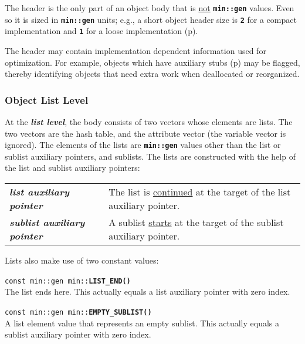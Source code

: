\documentclass[12pt]{article}
\makeatletter
\newcommand{\TT}[1]{{\tt \bfseries #1}}
\newcommand{\key}[1]{{\bf \em #1}\index{#1}}
\newcommand{\ttindex}[1]{\index{#1@{\tt #1}}}
\newcommand{\pagref}[1]{p\pageref{#1}}
\newenvironment{indpar}[1][0.3in]%
	{\begin{list}{}%
		     {\setlength{\itemsep}{0in}%
		      \setlength{\topsep}{0in}%
		      \setlength{\parsep}{1ex}%
		      \setlength{\labelwidth}{#1}%
		      \setlength{\leftmargin}{#1}%
		      \addtolength{\leftmargin}{\labelsep}}%
	 \item}%
	{\end{list}}
\newcommand{\LABEL}[1]{\label{#1}}
\newcommand{\MINKEY}[1]%
	   {\TT{#1}\ttindex{min::#1}\ttindex{#1}}
\makeatother
\begin{document}
The header is the only part of an object body that is
\underline{not} \TT{min::gen} values.  Even so it is
sized in \TT{min::gen} units; e.g., a short object header size
is \TT{2} for a compact implementation and \TT{1}
for a loose implementation (\pagref{COMPACT-OR-LOOSE}).

The header may contain implementation dependent information used
for optimization.
For example, objects which have auxiliary stubs
(\pagref{OBJECT-AUXILIARY-STUBS})
may be flagged, thereby identifying objects that need extra work
when deallocated or reorganized.

\subsubsection{Object List Level}
\label{OBJECT-LIST-LEVEL}

At the \key{list level},\label{LIST-LEVEL}
the body consists of two vectors whose
elements are lists.  The two vectors are the hash table, and the
attribute vector (the variable vector is ignored).
The elements of the lists are
\TT{min::gen} values other than the list or sublist auxiliary
pointers, and sublists.  The lists are constructed with
the help of the list and sublist auxiliary pointers:

\begin{center}
\begin{tabular}{lp{3in}}
\key{list auxiliary pointer} &
The list is \underline{continued} at the target of the list auxiliary pointer.
\\[2ex]
\key{sublist auxiliary pointer}	&
A sublist \underline{starts} at the target of the sublist auxiliary pointer.
\end{tabular}
\end{center}

Lists also make use of two constant values:

\begin{indpar}
\begin{list}{}{}
\item[{\tt const min::gen min::}\MINKEY{LIST\_END()}]~\LABEL{MIN::LIST_END}\\
The list ends here.
This actually equals a list auxiliary pointer with zero index.
\item[{\tt const min::gen min::}\MINKEY{EMPTY\_SUBLIST()}]~%
	\LABEL{MIN::EMPTY_SUBLIST}\\
A list element value that represents an empty sublist.
This actually equals a sublist auxiliary pointer with zero index.
\end{list}
\end{indpar}
\end{document}

